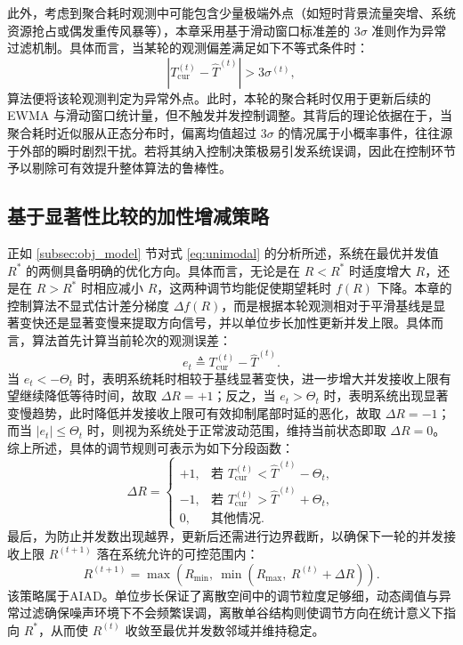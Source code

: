\documentclass[master, vlined]{DissertUESTC}
\begin{document}
	此外，考虑到聚合耗时观测中可能包含少量极端外点（如短时背景流量突增、系统资源抢占或偶发重传风暴等），本章采用基于滑动窗口标准差的 $3\sigma$ 准则作为异常过滤机制。具体而言，当某轮的观测偏差满足如下不等式条件时：
	\begin{equation}
		\left|T_{\mathrm{cur}}^{(t)}-\hat{T}^{(t)}\right|>3\sigma^{(t)},
	\label{eq:outlier_alg}
	\end{equation}
	算法便将该轮观测判定为异常外点。此时，本轮的聚合耗时仅用于更新后续的 EWMA 与滑动窗口统计量，但不触发并发控制调整。其背后的理论依据在于，当聚合耗时近似服从正态分布时，偏离均值超过 $3\sigma$ 的情况属于小概率事件，往往源于外部的瞬时剧烈干扰。若将其纳入控制决策极易引发系统误调，因此在控制环节予以剔除可有效提升整体算法的鲁棒性。

	\subsection{基于显著性比较的加性增减策略}

	正如 \ref{subsec:obj_model} 节对式 \eqref{eq:unimodal} 的分析所述，系统在最优并发值 $R^*$ 的两侧具备明确的优化方向。具体而言，无论是在 $R<R^*$ 时适度增大 $R$，还是在 $R>R^*$ 时相应减小 $R$，这两种调节均能促使期望耗时 $f(R)$ 下降。本章的控制算法不显式估计差分梯度 $\Delta f(R)$，而是根据本轮观测相对于平滑基线是显著变快还是显著变慢来提取方向信号，并以单位步长加性更新并发上限。具体而言，算法首先计算当前轮次的观测误差：
	\begin{equation}
		e_t \triangleq T_{\mathrm{cur}}^{(t)}-\hat{T}^{(t)}.
	\end{equation}
	当 $e_t < -\Theta_t$ 时，表明系统耗时相较于基线显著变快，进一步增大并发接收上限有望继续降低等待时间，故取 $\Delta R = +1$；反之，当 $e_t > \Theta_t$ 时，表明系统出现显著变慢趋势，此时降低并发接收上限可有效抑制尾部时延的恶化，故取 $\Delta R = -1$；而当 $|e_t| \le \Theta_t$ 时，则视为系统处于正常波动范围，维持当前状态即取 $\Delta R = 0$。综上所述，具体的调节规则可表示为如下分段函数：
	\begin{equation}
		\Delta R = \begin{cases}
			+1, & \text{若 } T_{\mathrm{cur}}^{(t)} < \hat{T}^{(t)} - \Theta_t, \\
			-1, & \text{若 } T_{\mathrm{cur}}^{(t)} > \hat{T}^{(t)} + \Theta_t, \\
			0, & \text{其他情况}.
		\end{cases}
	\label{eq:deltaR_alg}
	\end{equation}
	最后，为防止并发数出现越界，更新后还需进行边界截断，以确保下一轮的并发接收上限 $R^{(t+1)}$ 落在系统允许的可控范围内：
	\begin{equation}
		R^{(t+1)}=\max\!\left(R_{\min},\ \min\!\left(R_{\max},\ R^{(t)}+\Delta R\right)\right).
	\label{eq:R_update_alg}
	\end{equation}
	该策略属于AIAD。单位步长保证了离散空间中的调节粒度足够细，动态阈值与异常过滤确保噪声环境下不会频繁误调，离散单谷结构则使调节方向在统计意义下指向 $R^*$，从而使 $R^{(t)}$ 收敛至最优并发数邻域并维持稳定。
\end{document}
